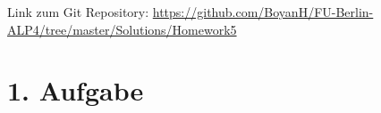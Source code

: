 \usepackage{graphicx}
\usepackage{amsmath}
\usepackage{amssymb}
\usepackage{fancyvrb}

\newcommand{\dozent}{Prof. Dr. Margarita Esponda}					%
\newcommand{\tutor}{Lilli Walter}						%
\newcommand{\tutoriumNo}{6}				%
\newcommand{\projectNo}{5}									%
\newcommand{\veranstaltung}{Nichtsequentielle Programmierung}	%
\newcommand{\semester}{SoeSe 2017}						%
\newcommand{\studenten}{Boyan Hristov, Sergelen Gongor}			%





Link zum Git Repository: \url{https://github.com/BoyanH/FU-Berlin-ALP4/tree/master/Solutions/Homework5}


\section*{1. Aufgabe}


